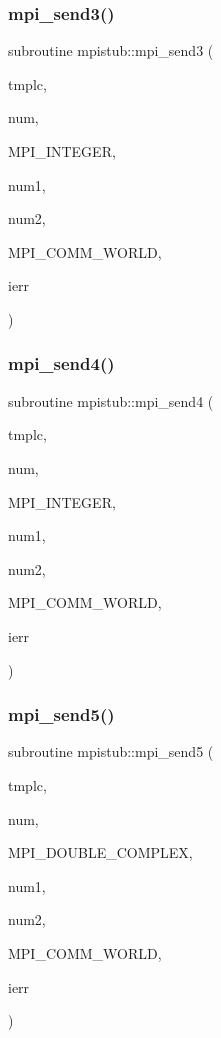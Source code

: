 \subsubsection{\texorpdfstring{mpi\_send3()}{mpi\_send3()}}
{\footnotesize\ttfamily subroutine mpistub\+::mpi\+\_\+send3 (\begin{DoxyParamCaption}\item[{integer, dimension(\+:)}]{tmplc,  }\item[{}]{num,  }\item[{}]{M\+P\+I\+\_\+\+I\+N\+T\+E\+G\+ER,  }\item[{}]{num1,  }\item[{}]{num2,  }\item[{}]{M\+P\+I\+\_\+\+C\+O\+M\+M\+\_\+\+W\+O\+R\+LD,  }\item[{}]{ierr }\end{DoxyParamCaption})}

\mbox{\label{namespacempistub_a1c957856f9f59c126b5a38101eb016b2}} 
\subsubsection{\texorpdfstring{mpi\_send4()}{mpi\_send4()}}
{\footnotesize\ttfamily subroutine mpistub\+::mpi\+\_\+send4 (\begin{DoxyParamCaption}\item[{integer}]{tmplc,  }\item[{}]{num,  }\item[{}]{M\+P\+I\+\_\+\+I\+N\+T\+E\+G\+ER,  }\item[{}]{num1,  }\item[{}]{num2,  }\item[{}]{M\+P\+I\+\_\+\+C\+O\+M\+M\+\_\+\+W\+O\+R\+LD,  }\item[{}]{ierr }\end{DoxyParamCaption})}

\mbox{\label{namespacempistub_a46c983917eca3492fa5ad9eadbb25b2e}} 
\subsubsection{\texorpdfstring{mpi\_send5()}{mpi\_send5()}}
{\footnotesize\ttfamily subroutine mpistub\+::mpi\+\_\+send5 (\begin{DoxyParamCaption}\item[{double complex, dimension(\+:,\+:)}]{tmplc,  }\item[{}]{num,  }\item[{}]{M\+P\+I\+\_\+\+D\+O\+U\+B\+L\+E\+\_\+\+C\+O\+M\+P\+L\+EX,  }\item[{}]{num1,  }\item[{}]{num2,  }\item[{}]{M\+P\+I\+\_\+\+C\+O\+M\+M\+\_\+\+W\+O\+R\+LD,  }\item[{}]{ierr }\end{DoxyParamCaption})}

